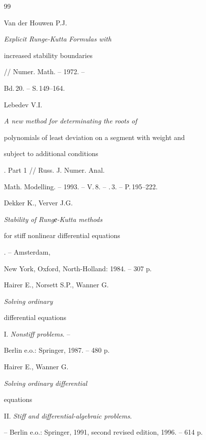 \begin{thebibliography}{99}




Van der Houwen P.J. {\em Explicit Runge-Kutta Formulas with


increased stability boundaries} // Numer. Math. -- 1972. --


Bd.\,20. -- S.\,149--164.






Lebedev V.I. {\em A new method for determinating the roots of


polynomials of least deviation on a segment with weight and


subject to additional conditions}. Part 1 // Russ. J. Numer. Anal.


Math. Modelling. -- 1993. -- V.\,8. -- \No.\,3. -- P.\,195--222.






Dekker K., Verver J.G. {\em Stability of Rungе-Kutta methods


for stiff nonlinear differential equations}. -- Amsterdam,


New York, Oxford, North-Holland: 1984. -- 307 p.






Hairer E., Norsett S.P., Wanner G.  {\em Solving ordinary


differential equations} I. {\em Nonstiff problems}. --


Berlin e.o.: Springer, 1987. -- 480 p.






Hairer E., Wanner G. {\em Solving ordinary differential


equations} II. {\em Stiff and differential-algebraic problems}.


-- Berlin e.o.: Springer, 1991, second revised edition, 1996. -- 614 p.





\end{thebibliography}





\vskip 2cm














\label{end}









